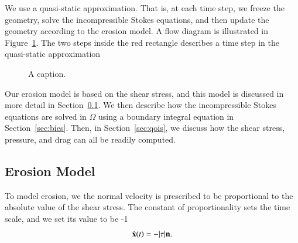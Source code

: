 \documentclass[preprint, 10pt]{elsarticle}
\begin{document}
We use a quasi-static approximation.  That is, at each time step, we
freeze the geometry, solve the incompressible Stokes equations, and then
update the geometry according to the erosion model.  A flow diagram is
illustrated in Figure~\ref{fig:workflow}.  The two steps inside the red
rectangle describes a time step in the quasi-static approximation
\begin{figure}[htpb]
  \centering
  
  \caption{\label{fig:workflow}A caption.}
\end{figure}

Our erosion model is based on the shear stress, and this model is
discussed in more detail in Section~\ref{sec:erosion}.  We then describe
how the incompressible Stokes equations are solved in $\Omega$ using a
boundary integral equation in Section~\ref{sec:bies}.  Then, in
Section~\ref{sec:qois}, we discuss how the shear stress, pressure, and
drag can all be readily computed.  


\subsection{Erosion Model} 
\label{sec:erosion}

To model erosion, we the normal velocity is prescribed to be
proportional to the absolute value of the shear stress.  The constant of
proportionality sets the time scale, and we set its value to be -1
\begin{align}
  \dot{{\mathbf{x}}}(t) = -|\tau| {\mathbf{n}}.
  \label{eqn:bodyEvolution}
\end{align}



\end{document}

